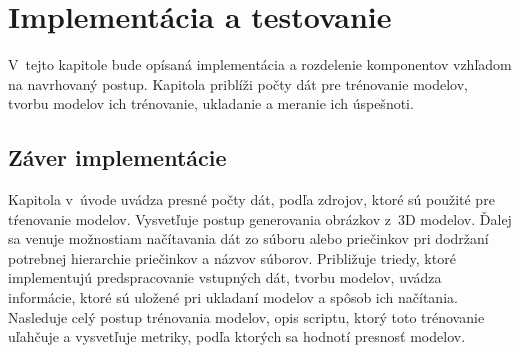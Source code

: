
\chapter{Implementácia a testovanie}

V~tejto kapitole bude opísaná implementácia a rozdelenie komponentov vzhľadom na navrhovaný postup.
Kapitola priblíži počty dát pre trénovanie modelov, tvorbu modelov ich trénovanie, ukladanie a meranie ich úspešnoti.









\section{Záver implementácie}

Kapitola v~úvode uvádza presné počty dát, podľa zdrojov, ktoré sú použité pre tŕenovanie modelov.
Vysvetľuje postup generovania obrázkov z~3D modelov.
Ďalej sa venuje možnostiam načítavania dát zo súboru alebo priečinkov pri dodržaní potrebnej hierarchie priečinkov a názvov súborov.
Približuje triedy, ktoré implementujú predspracovanie vstupných dát, tvorbu modelov, uvádza informácie, ktoré sú uložené
    pri ukladaní modelov a spôsob ich načítania.
Nasleduje celý postup trénovania modelov, opis scriptu, ktorý toto trénovanie uľahčuje a vysvetľuje metriky, podľa ktorých sa hodnotí presnosť modelov.
